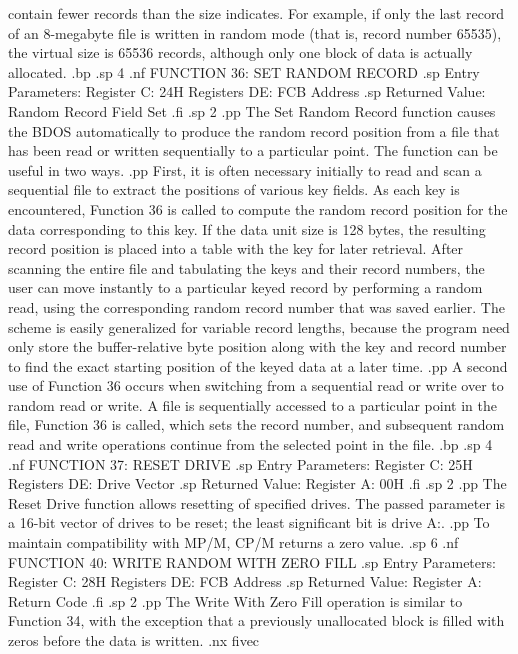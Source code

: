 contain fewer records than the size indicates.  For example, 
if only the last record of an 8-megabyte file is written in 
random mode (that is, record number 65535), the virtual size is 
65536 records, although only one block of data is actually 
allocated.
.bp
.sp 4
.nf
                 FUNCTION 36:  SET RANDOM RECORD
.sp
                 Entry Parameters:
                       Register C:  24H
                     Registers DE:  FCB Address
.sp
                 Returned Value:
                        Random Record Field Set
.fi
.sp 2
.pp
The Set Random Record function causes the BDOS automatically
to produce the random record position from a file that has been 
read or written sequentially to a particular point.  The function 
can be useful in two ways.
.pp
First, it is often necessary initially to read and scan a 
sequential file to extract the positions of various key fields.  
As each key is encountered, Function 36 is called to compute the 
random record position for the data corresponding to this key.  If 
the data unit size is 128 bytes, the resulting record position is 
placed into a table with the key for later retrieval.  After 
scanning the entire file and tabulating the keys and their record 
numbers, the user can move instantly to a particular keyed record 
by performing a random read, using the corresponding random 
record number that was saved earlier.  The scheme is easily 
generalized for variable record lengths, because the program need 
only store the buffer-relative byte position along with the key 
and record number to find the exact starting position of the 
keyed data at a later time.
.pp
A second use of Function 36 occurs when switching from a 
sequential read or write over to random read or write.  A file is 
sequentially accessed to a particular point in the file, Function 
36 is called, which sets the record number, and subsequent random 
read and write operations continue from the selected point in the 
file.
.bp
.sp 4
.nf
                    FUNCTION 37:  RESET DRIVE
.sp
                 Entry Parameters:
                       Register C:  25H
                     Registers DE:  Drive Vector
.sp
                 Returned Value:
                      Register  A:  00H
.fi
.sp 2
.pp
The Reset Drive function allows resetting of specified drives.  
The passed parameter is a 16-bit vector of drives to be reset; 
the least significant bit is drive A:.
.pp
To maintain compatibility with MP/M, CP/M returns a zero value.
.sp 6
.nf
            FUNCTION 40:  WRITE RANDOM WITH ZERO FILL
.sp
                 Entry Parameters:
                       Register C:  28H
                     Registers DE:  FCB Address
.sp
                 Returned Value:
                      Register  A:  Return Code
.fi
.sp 2
.pp
The Write With Zero Fill operation is similar to Function 34, 
with the exception that a previously unallocated block is filled 
with zeros before the data is written.
.nx fivec
